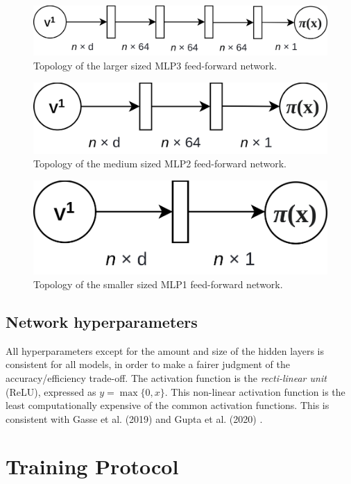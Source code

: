 \begin{figure}
    \centering
    \includegraphics[width=0.8\linewidth]{img/mlp3.png}
    \caption{Topology of the larger sized MLP3 feed-forward network.}
    \label{fig:topo_mlp3}
\end{figure}

\begin{figure}
    \centering
    \includegraphics[width=0.55\linewidth]{img/mlp2.png}
    \caption{Topology of the medium sized MLP2 feed-forward network.}
    \label{fig:topo_mlp2}
\end{figure}

\begin{figure}
    \centering
    \includegraphics[width=0.45\linewidth]{img/mlp1.png}
    \caption{Topology of the smaller sized MLP1 feed-forward network.}
    \label{fig:topo_mlp1}
\end{figure}



\subsection{Network hyperparameters}

All hyperparameters except for the amount and size of the hidden layers is consistent for all models, in order to make a fairer judgment of the accuracy/efficiency trade-off. The activation function is the \textit{recti-linear unit} (ReLU), expressed as $y = \max \{ 0, x\}$. This non-linear activation function is the least computationally expensive of the common activation functions. This is consistent with Gasse et al. (2019) \cite{gasse2019exact} and Gupta et al. (2020) \cite{gupta2020hybrid}.


\section{Training Protocol}\label{sec:trainingprotocol}

